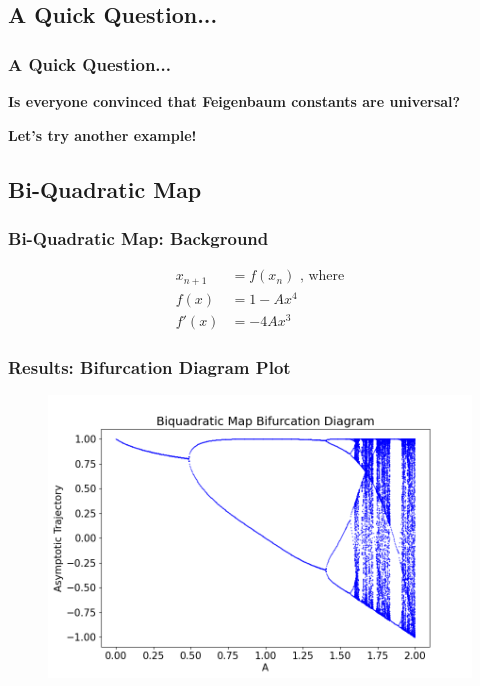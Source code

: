 \documentclass[
	11pt, %
	aspectratio=169, %
]{beamer}
\begin{document}

\subsection{A Quick Question...}

\begin{frame}
        \frametitle{A Quick Question...}
        \begin{center}
            \item \textbf{\large{Is everyone convinced that Feigenbaum constants are universal?}} \pause
            \item \textbf{\large{Let's try another example!}}
        \end{center}
\end{frame}

\subsection{Bi-Quadratic Map}

\begin{frame}
        \frametitle{Bi-Quadratic Map: Background}
        \begin{align*}
            x_{n+1} &= f(x_n) \text{ , where}\\
            f(x) &= 1 - Ax^4 \\
            f'(x) &= -4Ax^3
        \end{align*}
\end{frame}


\begin{frame}
        \frametitle{Results: Bifurcation Diagram Plot}
        \begin{figure}
            \includegraphics[width=0.6\linewidth]
            {biquadratic_bifurcation_diagram.png}
        \end{figure}
\end{frame}
\end{document}
